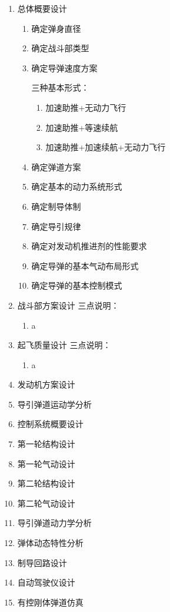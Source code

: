 \begin{enumerate}[1.]
\item 总体概要设计
    \begin{enumerate}[i]
        \item 确定弹身直径
        \item 确定战斗部类型
        \item 确定导弹速度方案
        {\kaishu 三种基本形式：
            \begin{enumerate}[a]
                \item 加速助推+无动力飞行
                \item 加速助推+等速续航
                \item 加速助推+加速续航+无动力飞行
            \end{enumerate}
        }
        \item 确定弹道方案
        \item 确定基本的动力系统形式
        \item 确定制导体制
        \item 确定导引规律
        \item 确定对发动机推进剂的性能要求
        \item 确定导弹的基本气动布局形式
        \item 确定导弹的基本控制模式
    \end{enumerate}
\item 战斗部方案设计
    三点说明：
    \begin{enumerate}[i]
        \item a
    \end{enumerate}
\item 起飞质量设计
    三点说明：
\begin{enumerate}[i]
    \item a
\end{enumerate}
\item 发动机方案设计
\item 导引弹道运动学分析
\item 控制系统概要设计
\item 第一轮结构设计
\item 第一轮气动设计
\item 第二轮结构设计
\item 第二轮气动设计
\item 导引弹道动力学分析
\item 弹体动态特性分析
\item 制导回路设计
\item 自动驾驶仪设计
\item 有控刚体弹道仿真

\end{enumerate}

